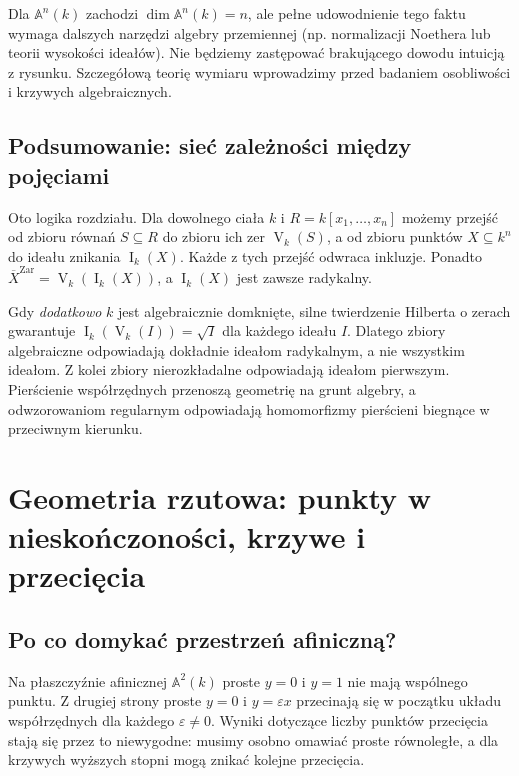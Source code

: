 \documentclass[11pt,a4paper,openany]{report}
\numberwithin{equation}{section}
\theoremstyle{plain}
\theoremstyle{definition}
\theoremstyle{remark}
\newcommand{\A}{\mathbb A}
\newcommand{\V}{\operatorname V}
\newcommand{\I}{\operatorname I}
\begin{document}
Dla $\A^n(k)$ zachodzi $\dim\A^n(k)=n$, ale pełne
udowodnienie tego faktu wymaga dalszych narzędzi algebry przemiennej
(np. normalizacji Noethera lub teorii wysokości ideałów).
Nie będziemy zastępować brakującego dowodu intuicją z rysunku.
Szczegółową teorię wymiaru wprowadzimy przed badaniem
osobliwości i krzywych algebraicznych.

\section{Podsumowanie: sieć zależności między pojęciami}

Oto logika rozdziału. Dla dowolnego ciała $k$ i
$R=k[x_1,\dots,x_n]$ możemy przejść od zbioru równań
$S\subseteq R$ do zbioru ich zer $\V_k(S)$, a od zbioru
punktów $X\subseteq k^n$ do ideału znikania $\I_k(X)$.
Każde z tych przejść odwraca inkluzje. Ponadto
$\overline X^{\mathrm{Zar}}=\V_k(\I_k(X))$,
a $\I_k(X)$ jest zawsze radykalny.

Gdy \emph{dodatkowo} $k$ jest algebraicznie domknięte,
silne twierdzenie Hilberta o zerach gwarantuje
$\I_k(\V_k(I))=\sqrt I$ dla każdego ideału $I$.
Dlatego zbiory algebraiczne odpowiadają dokładnie
ideałom radykalnym, a nie wszystkim ideałom.
Z kolei zbiory nierozkładalne odpowiadają ideałom pierwszym.
Pierścienie współrzędnych przenoszą geometrię na grunt algebry,
a odwzorowaniom regularnym odpowiadają homomorfizmy
pierścieni biegnące w przeciwnym kierunku.
\chapter{Geometria rzutowa: punkty w nieskończoności, krzywe i przecięcia}
\label{ch:rzutowa}

\section{Po co domykać przestrzeń afiniczną?}

Na płaszczyźnie afinicznej $\A^2(k)$ proste $y=0$ i $y=1$ nie
mają wspólnego punktu. Z drugiej strony proste $y=0$ i $y=\varepsilon x$
przecinają się w początku układu współrzędnych dla każdego
$\varepsilon\ne0$. Wyniki dotyczące liczby punktów przecięcia
stają się przez to niewygodne: musimy osobno omawiać proste równoległe,
a dla krzywych wyższych stopni mogą znikać kolejne przecięcia.
\end{document}
